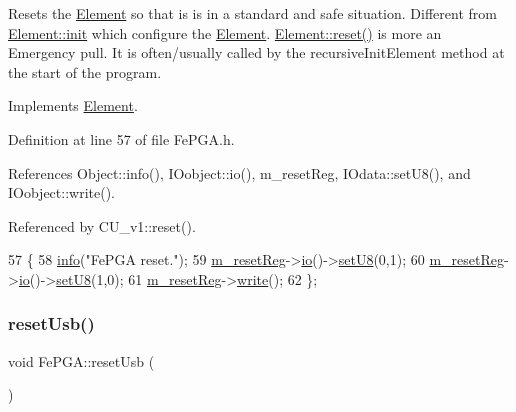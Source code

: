 Resets the \hyperlink{classElement}{Element} so that is is in a standard and safe situation. Different from \hyperlink{classElement_af42754b5cabc198869222725218d695c}{Element\+::init} which configure the \hyperlink{classElement}{Element}. \hyperlink{classElement_a69efffa22f06909d768149715565cb56}{Element\+::reset()} is more an Emergency pull. It is often/usually called by the recursive\+Init\+Element method at the start of the program. 

Implements \hyperlink{classElement_a69efffa22f06909d768149715565cb56}{Element}.



Definition at line 57 of file Fe\+P\+G\+A.\+h.



References Object\+::info(), I\+Oobject\+::io(), m\+\_\+reset\+Reg, I\+Odata\+::set\+U8(), and I\+Oobject\+::write().



Referenced by C\+U\+\_\+v1\+::reset().


\begin{DoxyCode}
57                \{
58     \hyperlink{classObject_a644fd329ea4cb85f54fa6846484b84a8}{info}(\textcolor{stringliteral}{"FePGA reset."});
59     \hyperlink{classFePGA_aeff1a2370237a06b50e1ae23d933c862}{m\_resetReg}->\hyperlink{classIOobject_af04fb94137c3d86849f478ac5afab5d1}{io}()->\hyperlink{classIOdata_a6c4fb2f2af01889ada889c2b7aceb24d}{setU8}(0,1);
60     \hyperlink{classFePGA_aeff1a2370237a06b50e1ae23d933c862}{m\_resetReg}->\hyperlink{classIOobject_af04fb94137c3d86849f478ac5afab5d1}{io}()->\hyperlink{classIOdata_a6c4fb2f2af01889ada889c2b7aceb24d}{setU8}(1,0);
61     \hyperlink{classFePGA_aeff1a2370237a06b50e1ae23d933c862}{m\_resetReg}->\hyperlink{classIOobject_a9f6984bc9f0fadcf800f1be2523ac744}{write}();
62   \};
\end{DoxyCode}
\mbox{\label{classFePGA_a79d95b2fccf4d2ea473e6cf6980d6cf6}} 
\subsubsection{\texorpdfstring{reset\+Usb()}{resetUsb()}}
{\footnotesize\ttfamily void Fe\+P\+G\+A\+::reset\+Usb (\begin{DoxyParamCaption}{ }\end{DoxyParamCaption})\hspace{0.3cm}{\ttfamily [inline]}}



